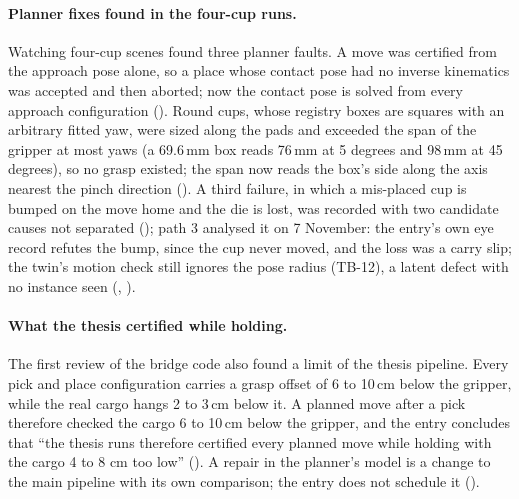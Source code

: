\paragraph{Planner fixes found in the four-cup runs.} Watching four-cup scenes
found three planner faults. A move was certified from the approach pose alone, so a
place whose contact pose had no inverse kinematics was accepted and then aborted;
now the contact pose is solved from every approach configuration (). Round
cups, whose registry boxes are squares with an arbitrary fitted yaw, were sized
along the pads and exceeded the span of the gripper at most yaws (a 69.6\,mm box
reads 76\,mm at 5 degrees and 98\,mm at 45 degrees), so no grasp existed; the
span now reads the box's side along the axis nearest the pinch direction ().
A third failure, in which a mis-placed cup is bumped on the move home and the die
is lost, was recorded with two candidate causes not separated (); path 3
analysed it on 7 November: the entry's own eye record refutes the bump, since the cup
never moved, and the loss was a carry slip; the twin's motion check still ignores the
pose radius (TB-12), a latent defect with no instance seen (, ).

\paragraph{What the thesis certified while holding.} The first review of the
bridge code also found a limit of the thesis pipeline. Every pick and place
configuration carries a grasp offset of 6 to 10\,cm below the gripper, while the
real cargo hangs 2 to 3\,cm below it. A planned move after a pick therefore
checked the cargo 6 to 10\,cm below the gripper, and the entry concludes that ``the
thesis runs therefore certified every planned move while holding with the cargo 4
to 8 cm too low'' (). A repair in the planner's model is a change to the main
pipeline with its own comparison; the entry does not schedule it ().

